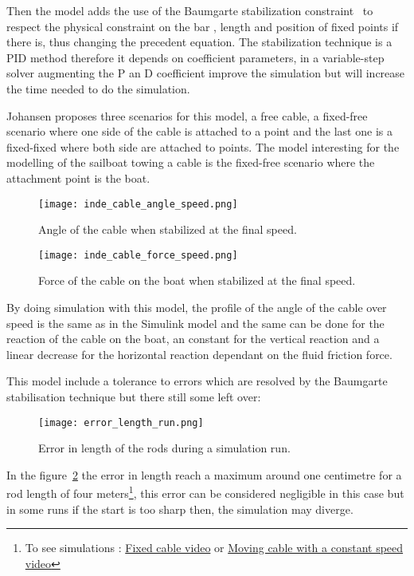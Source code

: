 Then the model adds the use of the Baumgarte stabilization constraint~\cite{baumgarte1972stabilization} to respect the physical constraint on the bar , length and position of fixed points if there is, thus changing the precedent equation. 
The stabilization technique is a PID method therefore it depends on coefficient parameters, in a variable-step solver augmenting the P an D coefficient improve the simulation but will increase the time needed to do the simulation.

Johansen proposes three scenarios for this model, a free cable, a fixed-free scenario where one side of the cable is attached to a point and the last one is a fixed-fixed where both side are attached to points.
The model interesting for the modelling of the sailboat towing a cable is the fixed-free scenario where the attachment point is the boat.

\begin{figure}[H]
\centering
    \begin{minipage}[b]{0.4\textwidth}
    \centering
    \texttt{[image: inde\_cable\_angle\_speed.png]}
    \caption{Angle of the cable when stabilized at the final speed.}
    \label{fig:angleIndSpeed}
    \end{minipage}
    \hfill
    \begin{minipage}[b]{0.45\textwidth}
    \centering
    \texttt{[image: inde\_cable\_force\_speed.png]}
    \caption{Force of the cable on the boat when stabilized at the final speed.}
    \label{fig:forceIndSpeed}
    \end{minipage}
\end{figure}

By doing simulation with this model, the profile of the angle of the cable over speed is the same as in the Simulink model and the same can be done for the reaction of the cable on the boat, an constant for the vertical reaction and a linear decrease for the horizontal reaction dependant on the fluid friction force.

This model include a tolerance to errors which are resolved by the Baumgarte stabilisation technique but 
there still some left over:


\begin{figure}[H]
\centering
    \texttt{[image: error\_length\_run.png]}
    \caption{Error in length of the rods during a simulation run.}
    \label{fig:errorLRod}
\end{figure}

In the figure~\ref{fig:errorLRod} the error in length reach a maximum around one centimetre for a rod length of four meters\footnote{To see simulations : \href{https://www.youtube.com/watch?v=T7DRGq3E5x8}{Fixed cable video} or \href{https://www.youtube.com/watch?v=V4X0PsgsXZY to see simulations}{Moving cable with a constant speed video}}, this error can be considered negligible in this case but in some runs if the start is too sharp then, the simulation may diverge.

